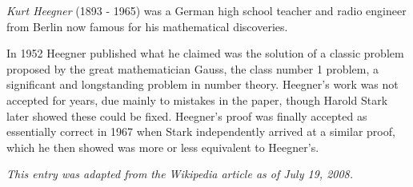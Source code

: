 \documentclass[12pt]{article}
\begin{document}
\emph{Kurt Heegner} (1893 - 1965) was a German high school teacher and radio engineer from Berlin now famous for his mathematical discoveries.

In 1952 Heegner published what he claimed was the solution of a classic problem proposed by the great mathematician Gauss, the class number 1 problem, a significant and longstanding problem in number theory. Heegner's work was not accepted for years, due mainly to mistakes in the paper, though Harold Stark later showed these could be fixed. Heegner's proof was finally accepted as essentially correct in 1967 when Stark independently arrived at a similar proof, which he then showed was more or less equivalent to Heegner's.

{\it This entry was adapted from the Wikipedia article  as of July 19, 2008.}
\end{document}
